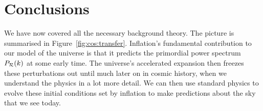 \section{Conclusions}
We have now covered all the necessary background theory. The picture is summarised in Figure~\ref{fig:cos:transfer}. Inflation's fundamental contribution to our model of the universe is that it predicts the primordial power spectrum \(P_\mathcal{R}(k)\) at some early time. The universe's accelerated expansion then freezes these perturbations out until much later on in cosmic history, when we understand the physics in a lot more detail. We can then use standard physics to evolve these initial conditions set by inflation to make predictions about the sky that we see today.
